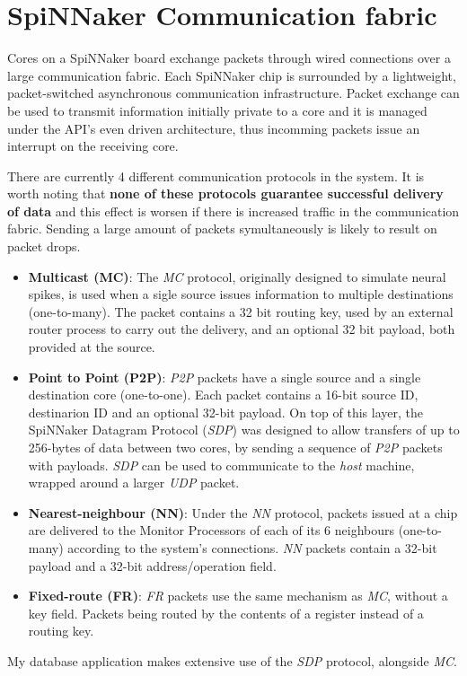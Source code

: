 \section{SpiNNaker Communication fabric}
\label{sec:comm_fabric}

Cores on a SpiNNaker board exchange packets through wired connections over a large communication fabric. Each SpiNNaker chip is surrounded by a lightweight, packet-switched asynchronous communication infrastructure.\cite{spinnchip} Packet exchange can be used to transmit information initially private to a core and it is managed under the API's even driven architecture, thus incomming packets issue an interrupt on the receiving core.

There are currently 4 different communication protocols in the system. It is worth noting that \textbf{none of these protocols guarantee successful delivery of data} and this effect is worsen if there is increased traffic in the communication fabric. Sending a large amount of packets symultaneously is likely to result on packet drops.

\begin{itemize}
\item \textbf{Multicast (MC)}: The \textit{MC} protocol, originally designed to simulate neural spikes, is used when a sigle source issues information to multiple destinations (one-to-many). The packet contains a 32 bit routing key, used by an external router process to carry out the delivery, and an optional 32 bit payload, both provided at the source.

\item \textbf{Point to Point (P2P)}: \textit{P2P} packets have a single source and a single destination core (one-to-one). Each packet contains a 16-bit source ID, destinarion ID and an optional 32-bit payload.\cite{datasheet}
On top of this layer, the SpiNNaker Datagram Protocol (\textit{SDP}) was designed to allow transfers of up to 256-bytes of data between two cores, by sending a sequence of \textit{P2P} packets with payloads.\cite{sdp} \textit{SDP} can be used to communicate to the \textit{host} machine, wrapped around a larger \textit{UDP} packet.

\item \textbf{Nearest-neighbour (NN)}: Under the \textit{NN} protocol, packets issued at a chip are delivered to the Monitor Processors of each of its 6 neighbours (one-to-many) according to the system's connections. \textit{NN} packets contain a 32-bit payload and a 32-bit address/operation field.\cite{datasheet}

\item \textbf{Fixed-route (FR)}: \textit{FR} packets use the same mechanism as \textit{MC}, without a key field. Packets being routed by the contents of a register instead of a routing key. 
\end{itemize}

My database application makes extensive use of the \textit{SDP} protocol, alongside \textit{MC}.



